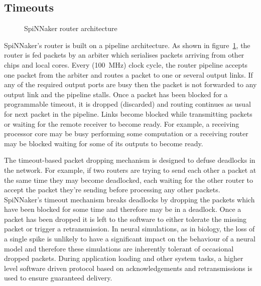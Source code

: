 		\subsection{Timeouts}
			
			\begin{figure}
				\center
				
				\caption{SpiNNaker router architecture}
				\label{fig:router-architecture}
			\end{figure}
			
			SpiNNaker's router is built on a pipeline architecture. As shown in
			figure~\ref{fig:router-architecture}, the router is fed packets by an
			arbiter which serialises packets arriving from other chips and local
			cores. Every (\SI{100}{\mega\hertz}) clock cycle, the router pipeline
			accepts one packet from the arbiter and routes a packet to one or several
			output links. If any of the required output ports are busy then the
			packet is not forwarded to any output link and the pipeline stalls. Once
			a packet has been blocked for a programmable timeout, it is dropped
			(discarded) and routing continues as usual for next packet in the
			pipeline. Links become blocked while transmitting packets or waiting for
			the remote receiver to become ready. For example, a receiving processor
			core may be busy performing some computation or a receiving router may be
			blocked waiting for some of its outputs to become ready.
			
			The timeout-based packet dropping mechanism is designed to defuse
			deadlocks in the network. For example, if two routers are trying to send
			each other a packet at the same time they may become deadlocked, each
			waiting for the other router to accept the packet they're sending before
			processing any other packets. SpiNNaker's timeout mechanism breaks
			deadlocks by dropping the packets which have been blocked for some time
			and therefore may be in a deadlock. Once a packet has been dropped it is
			left to the software to either tolerate the missing packet or trigger a
			retransmission. In neural simulations, as in biology, the loss of a
			single spike is unlikely to have a significant impact on the behaviour of
			a neural model and therefore these simulations are inherently tolerant of
			occasional dropped packets. During application loading and other system
			tasks, a higher level software driven protocol based on acknowledgements
			and retransmissions is used to ensure guaranteed delivery.
			
